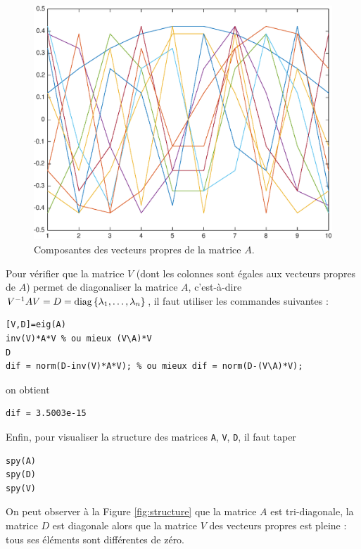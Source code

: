 \begin{figure}[h!]
  \centering
  \includegraphics[scale = 0.5]{s1/matlab/comp.eps}
  \caption{Composantes des vecteurs propres de la matrice $A$.}
  \label{fig:comp}
\end{figure}


Pour vérifier que la matrice $V$ (dont les colonnes sont égales aux vecteurs propres de $A$) permet de diagonaliser la matrice $A$, c'est-à-dire $V^{-1} A V = D = \text{diag} \left\{\lambda_{1}, \dots, \lambda_{n}\right\}$, il faut utiliser les commandes suivantes :


\begin{verbatim}
[V,D]=eig(A)
inv(V)*A*V % ou mieux (V\A)*V
D
dif = norm(D-inv(V)*A*V); % ou mieux dif = norm(D-(V\A)*V);
\end{verbatim}

on obtient

\begin{verbatim}
dif = 3.5003e-15
\end{verbatim}

Enfin, pour visualiser la structure des matrices \texttt{A}, \texttt{V}, \texttt{D}, il faut taper

\begin{verbatim}
spy(A)
spy(D)
spy(V)
\end{verbatim}

On peut observer à la Figure \ref{fig:structure} que la matrice $A$ est tri-diagonale, la matrice $D$ est diagonale alors que la matrice $V$ des vecteurs propres est pleine : tous ses éléments sont différentes de zéro.

